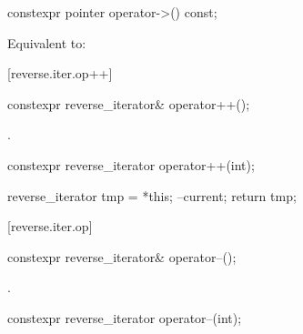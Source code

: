 %
\begin{itemdecl}
constexpr pointer operator->() const;
\end{itemdecl}

\begin{itemdescr}
\pnum
\effects Equivalent to: 
\end{itemdescr}

[reverse.iter.op++]{}

%
\begin{itemdecl}
constexpr reverse_iterator& operator++();
\end{itemdecl}

\begin{itemdescr}
\pnum
\effects
{}

\pnum
\returns
{}.
\end{itemdescr}

%
%
\begin{itemdecl}
constexpr reverse_iterator operator++(int);
\end{itemdecl}

\begin{itemdescr}
\pnum
\effects
\begin{codeblock}
reverse_iterator tmp = *this;
--current;
return tmp;
\end{codeblock}
\end{itemdescr}

[reverse.iter.op\dcr]{}

%
\begin{itemdecl}
constexpr reverse_iterator& operator--();
\end{itemdecl}

\begin{itemdescr}
\pnum
\effects
{}

\pnum
\returns
{}.
\end{itemdescr}

%
%
\begin{itemdecl}
constexpr reverse_iterator operator--(int);
\end{itemdecl}

